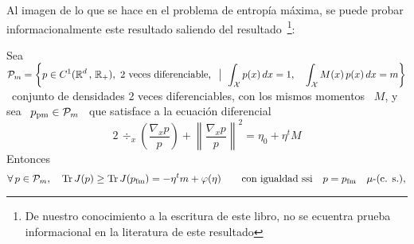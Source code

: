 Al imagen  de lo que  se hace  en el problema  de entrop\'ia m\'axima,  se puede
probar  informacionalmente este  resultado  saliendo del  resultado~\footnote{De
nuestro  conocimiento a  la  escritura  de este  libro,  no  se ecuentra  prueba
informacional en la literatura de este resultado}:
%
\begin{lema}
\label{Lem:SZ:MinFisherPruebaInfo}
%
  Sea   \    $\displaystyle   \P_m    =   \left\{    p   \in    C^1(\Rset^d   \,
  , \,  \Rset_+), \  \mbox{2 veces diferenciable,}  \ \tq \int_\X  p(x) \,  dx =
  1, \quad \int_\X M(x)  \, p(x) \, dx = m \right\}$ \  conjunto de densidades 2
  veces   diferenciables,   con  los   mismos   momentos   \   $M$,  y   sea   \
  $p_{\mathrm{pm}} \in \P_m$ \ que satisface a la ecuaci\'on diferencial
  \[
  2 \, \div_x \left(  \frac{\nabla_x p}{p} \right) + \left\| \frac{\nabla_x
  p}{p}  \right\|^2 = \eta_0 + \eta^t M
  \]
  Entonces
  \[
  \forall  \,  p \in  \P_m,  \quad  \Tr J(p) \ge  \Tr J(p_{\mathrm{fm}})  =  - \eta^t  m
  +    \varphi(\eta)    \qquad   \mbox{con    igualdad    ssi}    \quad   p    =
  p_{\mathrm{fm}} \quad \mu\mbox{-(c. s.)}, \]
\end{lema}
%
